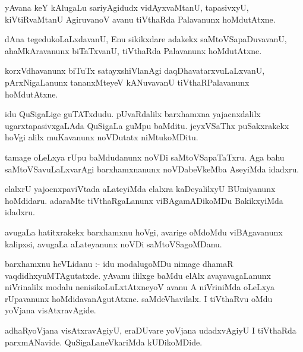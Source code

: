 \documentclass{article}
\begin{document}
\begin{mn}
yAvana  keY kAlugaLu  sariyAgidudx  vidAyxvaMtanU,  tapasivxyU,  kiVtiRvaMtanU  
AgiruvanoV  avanu  tiVthaRda  Palavanunx  hoMdutAtxne.
\end{mn}

\begin{mn}
dAna  tegedukoLaLxdavanU,  Enu sikikxdare  adakekx  saMtoVSapaDuvavanU,  
ahaMkAravanunx  biTaTxvanU,  tiVthaRda  Palavanunx  hoMdutAtxne.
\end{mn}

\begin{mn}
korxVdhavanunx  biTuTx  satayxshiVlanAgi  daqDhavatarxvuLaLxvanU,  pArxNigaLanunx  
tananxMteyeV  kANuvavanU  tiVthaRPalavanunx  hoMdutAtxne.
\end{mn}

\begin{mn}
idu  QuSigaLige  guTATxdudu.  pUvaRdalilx  barxhamxna  yajacnxdalilx  ugarxtapasivxgaLAda  
QuSigaLa  guMpu  baMditu.  jeyxVSaThx puSakxrakekx  hoVgi  alilx  muKavanunx  noVDutatx  niMtukoMDitu.
\end{mn}

\begin{mn}
tamage  oLeLxya  rUpu  baMdudanunx  noVDi  saMtoVSapaTaTxru.  Aga  bahu  saMtoVSavuLaLxvarAgi  
barxhamxnanunx  noVDabeVkeMba  AseyiMda  idadxru.
\end{mn}

\begin{mn}
elalxrU  yajocnxpaviVtada  aLateyiMda  elalxra  kaDeyalilxyU  BUmiyanunx  hoMdidaru.  adaraMte  
tiVthaRgaLanunx  viBAgamADikoMDu  BakikxyiMda  idadxru.
\end{mn}

\begin{mn}
avugaLa  hatitxrakekx  barxhamxnu  hoVgi,  avarige  oMdoMdu  viBAgavanunx  
kalipxsi,  avugaLa  aLateyanunx  noVDi  saMtoVSagoMDanu.
\end{mn}

\begin{mn}
barxhamxnu  heVLidanu :- idu  modalugoMDu  nimage  dhamaR  vaqdidhxyuMTAgutatxde.  yAvanu  
ililxge  baMdu  elAlx avayavagaLanunx  niVrinalilx  modalu  nenisikoLuLxtAtxneyoV  avanu  
A  niVriniMda  oLeLxya  rUpavanunx  hoMdidavanAgutAtxne.  saMdeVhavilalx.  I  
tiVthaRvu  oMdu  yoVjana  visAtxravAgide.
\end{mn}

\begin{mn}
adhaRyoVjana  visAtxravAgiyU,  eraDUvare yoVjana  udadxvAgiyU  I  tiVthaRda  
parxmANavide.  QuSigaLaneVkariMda  kUDikoMDide.
\end{mn}
\end{document}
